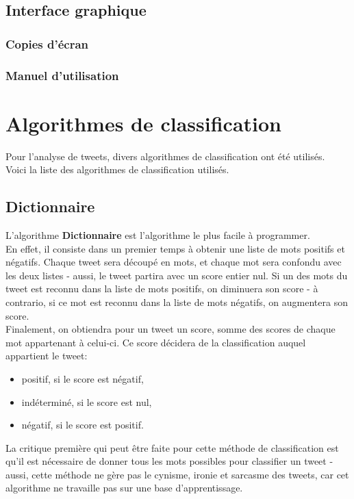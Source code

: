 \documentclass[pdftex,12pt,a4paper]{report}
\begin{document}
\begin{spacing}{1.2}
\section{Interface graphique}

\subsection{Copies d'écran}

\subsection{Manuel d'utilisation}

\chapter{Algorithmes de classification}

Pour l'analyse de tweets, divers algorithmes de classification ont été utilisés.\\
Voici la liste des algorithmes de classification utilisés.

\section{Dictionnaire}

L'algorithme \textbf{Dictionnaire} est l'algorithme le plus facile à programmer.\\
En effet, il consiste dans un premier temps à obtenir une liste de mots positifs et négatifs. Chaque tweet sera découpé en mots, et chaque mot sera confondu avec les deux listes - aussi, le tweet partira avec un score entier nul. Si un des mots du tweet est reconnu dans la liste de mots positifs, on diminuera son score - à contrario, si ce mot est reconnu dans la liste de mots négatifs, on augmentera son score.\\
Finalement, on obtiendra pour un tweet un score, somme des scores de chaque mot appartenant à celui-ci. Ce score décidera de la classification auquel appartient le tweet:
\begin{itemize}
\item{positif, si le score est négatif,}
\item{indéterminé, si le score est nul,}
\item{négatif, si le score est positif.}
\end{itemize}
La critique première qui peut être faite pour cette méthode de classification est qu'il est nécessaire de donner tous les mots possibles pour classifier un tweet - aussi, cette méthode ne gère pas le cynisme, ironie et sarcasme des tweets, car cet algorithme ne travaille pas sur une base d'apprentissage.


\end{spacing}
\end{document}
